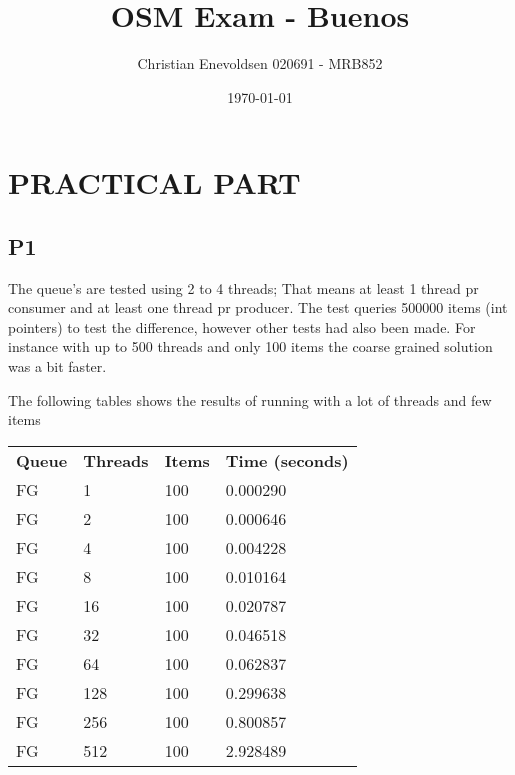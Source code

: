 \documentclass[12pt]{article}
\title{OSM Exam - Buenos}
\date{\today}
\author{Christian Enevoldsen 020691 - MRB852}
\begin{document}
\maketitle
\newpage
\tableofcontents
\newpage
\section{PRACTICAL PART}

\subsection{P1}

The queue's are tested using 2 to 4 threads; That means at least 1 thread pr consumer and at least one thread pr producer. The test queries 500000 items (int pointers) to test the difference, however other tests had also been made. For instance with up to 500 threads and only 100 items the coarse grained solution was a bit faster. 

The following tables shows the results of running with a lot of threads and few items



\begin{table}[h]
\begin{tabular}{llll}
\textbf{Queue} & \textbf{Threads} & \textbf{Items} & \textbf{Time (seconds)}\\
FG    &     1     &    100   &    0.000290 \\
FG    &     2     &    100   &    0.000646 \\
FG    &     4     &    100   &    0.004228 \\
FG    &     8     &    100   &    0.010164 \\
FG    &     16    &    100   &    0.020787 \\
FG    &     32    &    100   &    0.046518 \\
FG    &     64    &    100   &    0.062837 \\
FG    &     128   &    100   &    0.299638 \\
FG    &     256   &    100   &    0.800857 \\
FG    &     512   &    100   &    2.928489 \\
\end{tabular}
\end{table}
\end{document}
